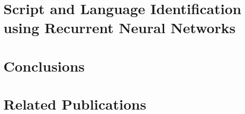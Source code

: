 \documentclass[11pt]{book}
\begin{document}
\chapter{Script and Language Identification using Recurrent Neural Networks}
\label{ch:chap4}



\chapter{Conclusions}
\label{ch:conc}



\chapter*{Related Publications}
\label{ch:relatedPubs}




 
\end{document}
